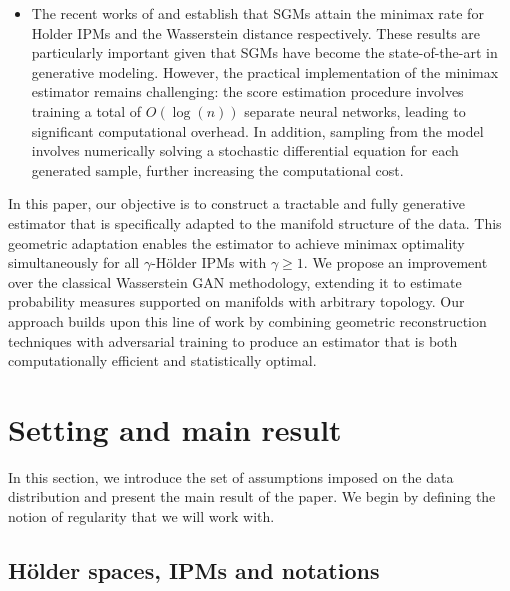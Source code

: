 \documentclass[10pt]{article}
\begin{document}
\begin{itemize}
    \item The recent works of \cite{azangulov2024convergence} and \cite{pmlr-v238-tang24a} establish that SGMs attain the minimax rate for Holder IPMs and the Wasserstein distance respectively. These results are particularly important given that SGMs have become the state-of-the-art in generative modeling. However, the practical implementation of the minimax estimator remains challenging: the score estimation procedure involves training a total of $O(\log(n))$ separate neural networks, leading to significant computational overhead. In addition, sampling from the model involves numerically solving a stochastic differential equation for each generated sample, further increasing the computational cost.
\end{itemize}

In this paper, our objective is to construct a tractable and fully generative estimator that is specifically adapted to the manifold structure of the data. This geometric adaptation enables the estimator to achieve minimax optimality simultaneously for all $\gamma$-Hölder IPMs with $\gamma \geq 1$. We propose an improvement over the classical Wasserstein GAN methodology, extending it to estimate probability measures supported on manifolds with arbitrary topology. Our approach builds upon this line of work by combining geometric reconstruction techniques with adversarial training to produce an estimator that is both computationally efficient and statistically optimal. 





\section{Setting and main result}
In this section, we introduce the set of assumptions imposed on the data distribution and present the main result of the paper. We begin by defining the notion of regularity that we will work with.

\subsection{Hölder spaces, IPMs and notations}
\end{document}
